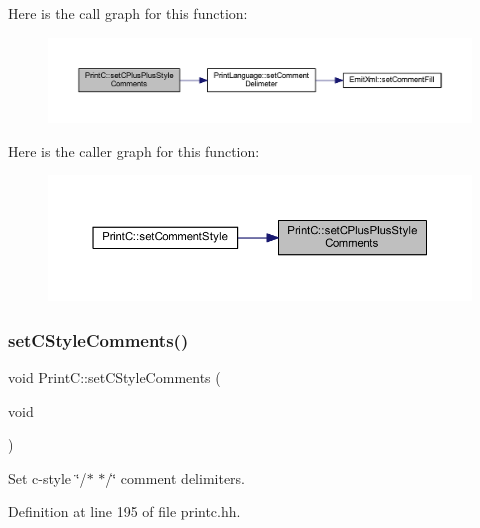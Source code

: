 Here is the call graph for this function\+:
\nopagebreak
\begin{figure}[H]
\begin{center}
\leavevmode
\includegraphics[width=350pt]{class_print_c_a4981b566fe7893b12da7d77e8cd35dfb_cgraph}
\end{center}
\end{figure}
Here is the caller graph for this function\+:
\nopagebreak
\begin{figure}[H]
\begin{center}
\leavevmode
\includegraphics[width=350pt]{class_print_c_a4981b566fe7893b12da7d77e8cd35dfb_icgraph}
\end{center}
\end{figure}
\mbox{\label{class_print_c_af5fb955a22b473013a2e04f69bc7715e}} 
\subsubsection{\texorpdfstring{setCStyleComments()}{setCStyleComments()}}
{\footnotesize\ttfamily void Print\+C\+::set\+C\+Style\+Comments (\begin{DoxyParamCaption}\item[{void}]{ }\end{DoxyParamCaption})\hspace{0.3cm}{\ttfamily [inline]}}



Set c-\/style \char`\"{}/$\ast$ $\ast$/\char`\"{} comment delimiters. 



Definition at line 195 of file printc.\+hh.

